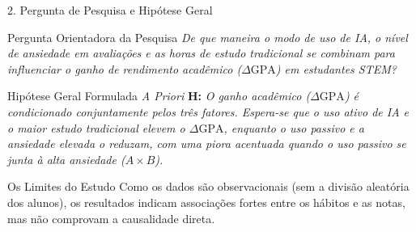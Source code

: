\documentclass[aspectratio=169, 10pt]{beamer}
\begin{document}
\begin{frame}{2. Pergunta de Pesquisa e Hipótese Geral}
    \begin{block}{Pergunta Orientadora da Pesquisa}
        \textit{De que maneira o modo de uso de IA, o nível de ansiedade em avaliações e as horas de estudo tradicional se combinam para influenciar o ganho de rendimento acadêmico ($\Delta \text{GPA}$) em estudantes STEM?}
    \end{block}

    \vspace{4pt}

    \begin{exampleblock}{Hipótese Geral Formulada \textit{A Priori}}
        \textbf{H:} \textit{O ganho acadêmico ($\Delta \text{GPA}$) é condicionado conjuntamente pelos três fatores. Espera-se que o uso ativo de IA e o maior estudo tradicional elevem o $\Delta \text{GPA}$, enquanto o uso passivo e a ansiedade elevada o reduzam, com uma piora acentuada quando o uso passivo se junta à alta ansiedade ($A \times B$).}
    \end{exampleblock}

    \vspace{4pt}

    \begin{alertblock}{Os Limites do Estudo}
        Como os dados são observacionais (sem a divisão aleatória dos alunos), os resultados indicam associações fortes entre os hábitos e as notas, mas não comprovam a causalidade direta.
    \end{alertblock}
\end{frame}
\end{document}
